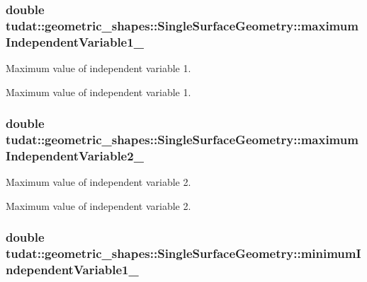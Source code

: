 \subsubsection[{\texorpdfstring{maximum\+Independent\+Variable1\+\_\+}{maximumIndependentVariable1_}}]{\setlength{\rightskip}{0pt plus 5cm}double tudat\+::geometric\+\_\+shapes\+::\+Single\+Surface\+Geometry\+::maximum\+Independent\+Variable1\+\_\+\hspace{0.3cm}{\ttfamily [protected]}}\hypertarget{classtudat_1_1geometric__shapes_1_1SingleSurfaceGeometry_ad293722bccd5fd354b37d392278272ab}{}\label{classtudat_1_1geometric__shapes_1_1SingleSurfaceGeometry_ad293722bccd5fd354b37d392278272ab}


Maximum value of independent variable 1. 

Maximum value of independent variable 1. 
\subsubsection[{\texorpdfstring{maximum\+Independent\+Variable2\+\_\+}{maximumIndependentVariable2_}}]{\setlength{\rightskip}{0pt plus 5cm}double tudat\+::geometric\+\_\+shapes\+::\+Single\+Surface\+Geometry\+::maximum\+Independent\+Variable2\+\_\+\hspace{0.3cm}{\ttfamily [protected]}}\hypertarget{classtudat_1_1geometric__shapes_1_1SingleSurfaceGeometry_a351c28e0101e03b52804290ef28c64f5}{}\label{classtudat_1_1geometric__shapes_1_1SingleSurfaceGeometry_a351c28e0101e03b52804290ef28c64f5}


Maximum value of independent variable 2. 

Maximum value of independent variable 2. 
\subsubsection[{\texorpdfstring{minimum\+Independent\+Variable1\+\_\+}{minimumIndependentVariable1_}}]{\setlength{\rightskip}{0pt plus 5cm}double tudat\+::geometric\+\_\+shapes\+::\+Single\+Surface\+Geometry\+::minimum\+Independent\+Variable1\+\_\+\hspace{0.3cm}{\ttfamily [protected]}}\hypertarget{classtudat_1_1geometric__shapes_1_1SingleSurfaceGeometry_a47690cfd9b5f3aabfd411f5ac561b153}{}\label{classtudat_1_1geometric__shapes_1_1SingleSurfaceGeometry_a47690cfd9b5f3aabfd411f5ac561b153}



